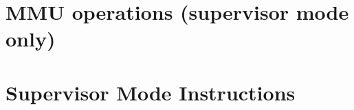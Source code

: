 \begin{description}

\item	{}
\item	{}
\item	{}
\item	{}

\end{description}

\section{MMU operations (supervisor mode only)}

\begin{description}

\item	{}

\item	{}

\item	{}

\end{description}

\section{Supervisor Mode Instructions}

\begin{description}
\item	{}
\item	{}
\item	{}
\item	{}
\item	{}
\item	{}
\item	{}
\item	{}
\item	{}
\end{description}


